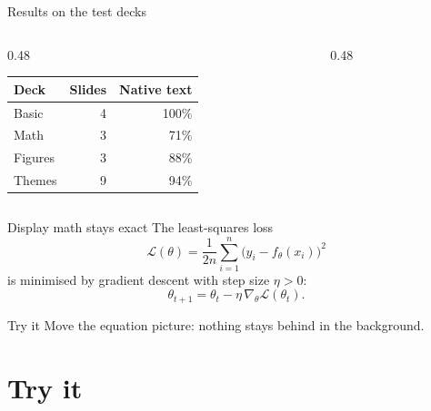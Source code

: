 \documentclass[aspectratio=169]{beamer}
\begin{document}
\begin{frame}{Results on the test decks}
  \begin{columns}[T]
    \begin{column}{0.48\textwidth}
      \begin{tabular}{lrr}
        \toprule
        Deck & Slides & Native text \\
        \midrule
        Basic & 4 & 100\% \\
        Math & 3 & 71\% \\
        Figures & 3 & 88\% \\
        Themes & 9 & 94\% \\
        \bottomrule
      \end{tabular}
    \end{column}
    \begin{column}{0.48\textwidth}
    \end{column}
  \end{columns}
\end{frame}

\begin{frame}{Display math stays exact}
  The least-squares loss
  \begin{equation}
    \mathcal{L}(\theta) = \frac{1}{2n} \sum_{i=1}^{n} \bigl(y_i - f_\theta(x_i)\bigr)^2
  \end{equation}
  is minimised by gradient descent with step size $\eta > 0$:
  \[
    \theta_{t+1} = \theta_t - \eta \, \nabla_\theta \mathcal{L}(\theta_t).
  \]
  \begin{exampleblock}{Try it}
    Move the equation picture: nothing stays behind in the background.
  \end{exampleblock}
\end{frame}

\section{Try it}
\end{document}
